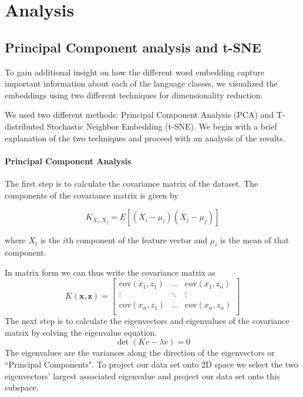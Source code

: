 \documentclass[11pt,a4paper]{article}
\begin{document}
 
\section{Analysis}

\subsection{Principal Component analysis and t-SNE}
To gain additional insight on how the different word embedding capture important information about each of the language classes, we visualized the embeddings using two different techniques for dimensionality reduction.

We used two different methods: Principal Component Analysis (PCA) and T-distributed Stochastic Neighbor Embedding (t-SNE).
We begin with a brief explanation of the two techniques and proceed with an analysis of the results.

\paragraph{Principal Component Analysis}

The first step is to calculate the covariance matrix of the dataset.
The components of the covariance matrix is given by

\begin{equation}
K_{X_i,X_j} = E[(X_i - \mu_i )(X_j -  \mu_j)]
\end{equation}

where $X_{i}$ is the $i$th component of the feature vector and $\mu_{i}$ is the mean of that component.

In matrix form we can thus write the covariance matrix as
\begin{equation}
K(\mathbf{x},\mathbf{z}) =
\begin{bmatrix}
    \text{cov}(x_1,z_1) &  \dots  & \text{cov}(x_1,z_n) \\
    \vdots & \ddots     & \vdots \\
    \text{cov}(x_n,z_1) & \dots  & \text{cov}(x_n,z_n) \\
\end{bmatrix}
\end{equation}
The next step is to calculate the eigenvectors and eigenvalues of the covariance matrix by solving the eigenvalue equation.
\begin{equation}
\det (K v-\lambda v) = 0
\end{equation}
The eigenvalues are the variances along the direction of the eigenvectors or ``Principal Components". To project our data set onto 2D space we select the two eigenvectors' largest associated eigenvalue and project our data set onto this subspace.
\end{document}
